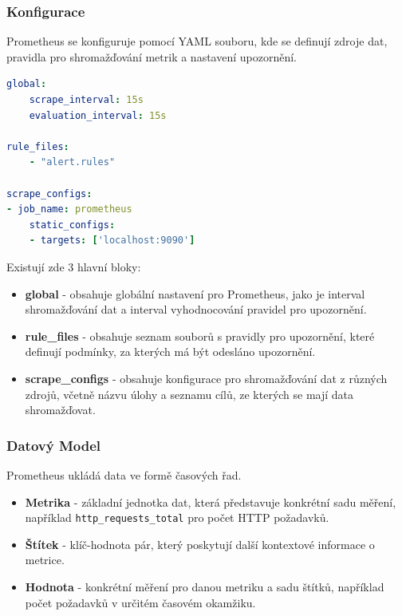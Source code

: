 \subsubsection{Konfigurace}
Prometheus se konfiguruje pomocí YAML souboru, kde se definují zdroje dat, pravidla pro shromažďování metrik a nastavení upozornění.
\begin{lstlisting}[language=YAML, caption={Prometheus - ukázka konfigurace}, label={lst:prometheusconfig}, captionpos=b]
global:
    scrape_interval: 15s
    evaluation_interval: 15s

rule_files:
    - "alert.rules"

scrape_configs:
- job_name: prometheus
    static_configs:
    - targets: ['localhost:9090']
\end{lstlisting}

Existují zde 3 hlavní bloky:
\begin{itemize}
    \item \textbf{global} - obsahuje globální nastavení pro Prometheus, jako je interval shromažďování dat a interval vyhodnocování pravidel pro upozornění.
    \item \textbf{rule\_files} - obsahuje seznam souborů s pravidly pro upozornění, které definují podmínky, za kterých má být odesláno upozornění.
    \item \textbf{scrape\_configs} - obsahuje konfigurace pro shromažďování dat z různých zdrojů, včetně názvu úlohy a seznamu cílů, ze kterých se mají data shromažďovat.
\end{itemize}

\subsubsection{Datový Model}
Prometheus ukládá data ve formě časových řad.

\begin{itemize}
    \item \textbf{Metrika} - základní jednotka dat, která představuje konkrétní sadu měření, například \texttt{http\_requests\_total} pro počet HTTP požadavků.
    \item \textbf{Štítek} - klíč-hodnota pár, který poskytují další kontextové informace o metrice.
    \item \textbf{Hodnota} - konkrétní měření pro danou metriku a sadu štítků, například počet požadavků v určitém časovém okamžiku.
\end{itemize}

